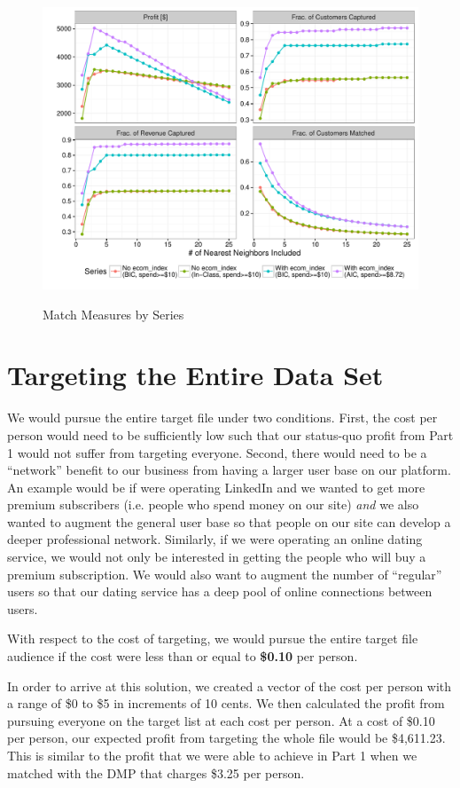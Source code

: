 \begin{figure}[!htb]
  \centering
  \caption{Match Measures by Series}
  \includegraphics[scale=.75]{profits.pdf}
  \label{fig:profits}
\end{figure}

\section{Targeting the Entire Data Set} %
We would pursue the entire target file under two conditions. First, the cost per person would need to be sufficiently low such that our status-quo profit from Part 1 would not suffer from targeting everyone. Second, there would need to be a “network” benefit to our business from having a larger user base on our platform. An example would be if were operating LinkedIn and we wanted to get more premium subscribers (i.e. people who spend money on our site) \textit{and} we also wanted to augment the general user base so that people on our site can develop a deeper professional network. Similarly, if we were operating an online dating service, we would not only be interested in getting the people who will buy a premium subscription. We would also want to augment the number of “regular” users so that our dating service has a deep pool of online connections between users.

With respect to the cost of targeting, we would pursue the entire target file audience if the cost were less than or equal to \textbf{\$0.10} per person.

In order to arrive at this solution, we created a vector of the cost per person with a range of \$0 to \$5 in increments of 10 cents. We then calculated the profit from pursuing everyone on the target list at each cost per person. At a cost of \$0.10 per person, our expected profit from targeting the whole file would be \$4,611.23. This is similar to the profit that we were able to achieve in Part 1 when we matched with the DMP that charges \$3.25 per person.

